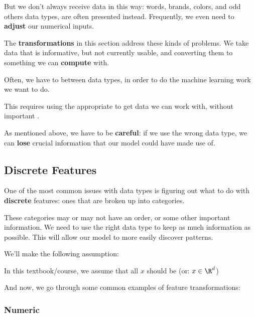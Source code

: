         But we don't always receive data in this way: words, brands, colors, and odd others data types, are often presented instead. Frequently, we even need to \textbf{adjust} our numerical inputs.

        The \textbf{transformations} in this section address these kinds of problems. We take data that is informative, but not currently usable, and converting them to something we can \textbf{compute} with.\\

        \begin{concept}
            Often, we have to  between data types, in order to do the machine learning work we want to do.

            This requires using the appropriate  to get data we can work with, without  important .
        \end{concept}

        As mentioned above, we have to be \textbf{careful}: if we use the wrong data type, we can \textbf{lose} crucial information that our model could have made use of.

        \subsecdiv

        \subsection{Discrete Features}

            One of the most common issues with data types is figuring out what to do with \textbf{discrete} features: ones that are broken up into categories.

            These categories may or may not have an order, or some other important information. We need to use the right data type to keep as much information as possible. This will allow our model to more easily discover patterns.

            We'll make the following assumption:\\

            \begin{clarification}
                In this textbook/course, we assume that all  $x$ should be  (or: $x \in \R^d$)
            \end{clarification}


            And now, we go through some common examples of feature transformations:

            \subsubsection{Numeric}

